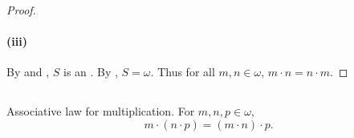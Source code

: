 \documentclass{report}
\begin{document}
\begin{proof}
  \paragraph{(iii)}%

    By  and , $S$
      is an .
    By , $S = \omega$.
    Thus for all $m, n \in \omega$, $m \cdot n = n \cdot m$.

\end{proof}

\subsection{}%

\begin{theorem}[4K-4]

  Associative law for multiplication.
  For $m, n, p \in \omega$, $$m \cdot (n \cdot p) = (m \cdot n) \cdot p.$$

\end{theorem}
\end{document}

